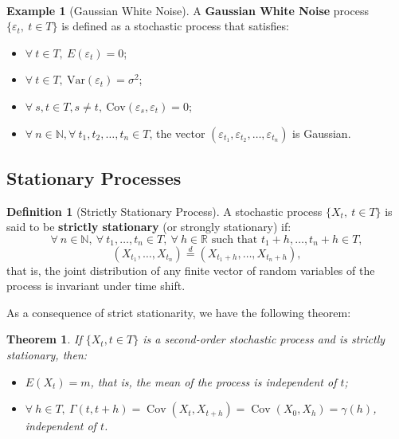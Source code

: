 \documentclass[
  11pt,
  a4paper,
]{book}
\newtheorem{theorem}{Theorem}[chapter]
\theoremstyle{definition}
\newtheorem{definition}{Definition}[chapter]
\theoremstyle{definition}
\newtheorem{example}{Example}[chapter]
\theoremstyle{definition}
\theoremstyle{definition}
\theoremstyle{remark}
\begin{document}
\(\,\)

\begin{example}[Gaussian White Noise]

A \textbf{Gaussian White Noise} process \(\{\varepsilon_t, ~t \in T\}\) is defined as a stochastic process that satisfies:

\begin{itemize}
\item
  \(\forall ~t \in T, ~E(\varepsilon_t)=0\);
\item
  \(\forall ~t \in T, ~\mathrm{Var}(\varepsilon_t)=\sigma^2\);
\item
  \(\forall ~s, t \in T, s \neq t, ~\mathrm{Cov}(\varepsilon_s,\varepsilon_t)=0\);
\item
  \(\forall ~n \in \mathbb{N}, \forall ~t_1, t_2, \ldots, t_n \in T\), the vector \((\varepsilon_{t_1}, \varepsilon_{t_2}, \ldots, \varepsilon_{t_n})\) is Gaussian.
\end{itemize}

\end{example}

\subsection{Stationary Processes}\label{stationary-processes}

\begin{definition}[Strictly Stationary Process]
A stochastic process \(\{X_t,~ t \in T\}\) is said to be \textbf{strictly stationary} (or strongly stationary) if:
\[
\forall~n \in \mathbb{N},~ \forall~t_1, \ldots, t_n \in T,~ \forall~h \in \mathbb{R} \text{ such that } t_1 + h, \ldots, t_n + h \in T,
\]
\[
(X_{t_1}, \ldots, X_{t_n}) \stackrel{d}{=} (X_{t_1+h}, \ldots, X_{t_n+h}),
\]
that is, the joint distribution of any finite vector of random variables of the process is invariant under time shift.
\end{definition}

As a consequence of strict stationarity, we have the following theorem:

\begin{theorem}

If \(\{X_t, t \in T\}\) is a second-order stochastic process and is strictly stationary, then:

\begin{itemize}
\item
  \(E(X_t) = m\), that is, the mean of the process is independent of \(t\);
\item
  \(\forall ~h \in T, ~ \Gamma(t,t+h) = \operatorname{Cov}(X_t, X_{t+h}) = \operatorname{Cov}(X_0, X_h) = \gamma(h)\),
  independent of \(t\).
\end{itemize}

\end{theorem}
\end{document}

